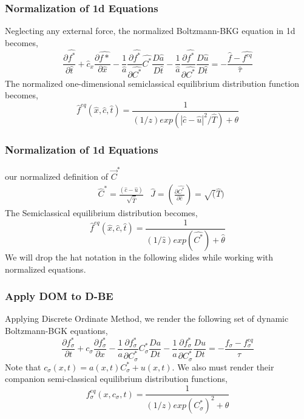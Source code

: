 \begin{frame}
	\frametitle{Normalization of 1d Equations}
	Neglecting any external force, the normalized Boltzmann-BKG equation in 1d becomes,
	\begin{equation}
	\frac{\partial \hat {f^*}}{\partial \hat t} + \hat c_x \frac{\partial \hat {f*}}{\partial \hat x} 
		- \frac{1}{\hat a} \frac{\partial \hat {f^*}}{\partial \hat {C^*}} \hat {C^*} \frac{D \hat a}{D \hat t}
		- \frac{1}{\hat a} \frac{\partial \hat {f^*}}{\partial \hat {C^*}} \frac{D \hat u}{D \hat t}
		= -\frac{\hat f - \hat {f^{eq}}}{\hat \tau}
	\end{equation}
	The normalized one-dimensional semiclassical equilibrium distribution function becomes,
	\begin{equation}
	\hat f^{eq} (\hat x,\hat c,\hat t) = \frac{1}{(1/z) exp(\left | \hat c - \hat u \right |^2 / \hat T)+\theta}
\end{equation}
	
\end{frame}

\begin{frame}
	\frametitle{Normalization of 1d Equations}
	our normalized definition of $\vec{C}^*$ 
	\begin{align*}
	&\hat C^* = \frac{(\hat c-\hat u)}{\sqrt{\hat T}} & \hat J = \left(\frac{\partial \hat {C^*}}{\partial \hat c} \right ) = \sqrt(\hat T) 
	\end{align*}
	The Semiclassical equilibrium distribution becomes,
	\begin{equation}
	\hat f^{eq} (\hat x,\hat c,\hat t) = \frac{1}{(1/ \hat z) exp(\hat {C^*})+\hat \theta}
	\label{eq:normadistf1d}
	\end{equation}
	We will drop the hat notation in the following slides while working with normalized equations.
\end{frame}

\begin{frame}
	\frametitle{Apply DOM to D-BE}
	Applying Discrete Ordinate Method, we render the following set of dynamic Boltzmann-BGK equations,
	\begin{equation}
	\frac{\partial {f_\sigma^*}}{\partial t} + c_\sigma \frac{\partial f_\sigma^*}{\partial x} 
		- \frac{1}{a} \frac{\partial f_\sigma^*}{\partial C_\sigma^*} C_\sigma^* \frac{Da}{Dt}
		- \frac{1}{a} \frac{\partial f_\sigma^*}{\partial C_\sigma^*} \frac{Du}{Dt}
		= -\frac{f_\sigma - f_\sigma^{eq}}{\tau}
	\end{equation}
	Note that $c_\sigma(x,t) = a(x,t) C_\sigma^* + u(x,t)$. We also must render their companion semi-classical equilibrium distribution functions,
	\begin{equation}
	f_\sigma^{eq} (x,c_\sigma,t) = \frac{1}{(1/z) exp(C_\sigma^*)^2 + \theta}
	\end{equation}
	
\end{frame}

